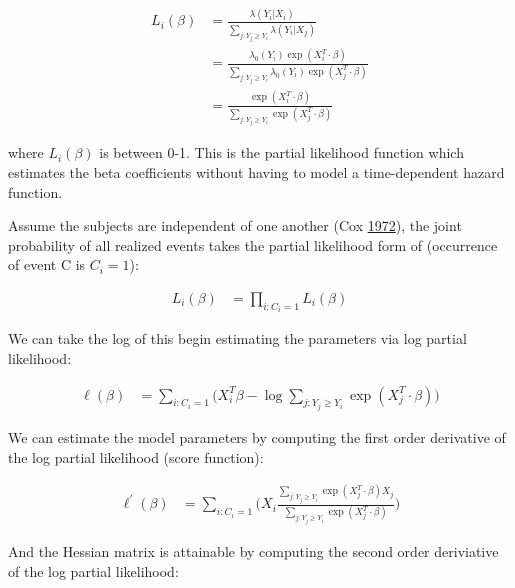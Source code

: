 \documentclass[]{DissertateOSU}
\begin{document}
\begin{equation}
\begin{split}
L_i(\beta) & = \frac{\lambda(Y_i|X_i)}{\sum_{j:Y_j \geq Y_i} \lambda(Y_i|X_j)} \\
& = \frac{\lambda_0(Y_i)\exp(X_{i}^{T} \cdot \beta)}{\sum_{j:Y_j \geq Y_i}\lambda_0(Y_i) \exp(X_{j}^{T} \cdot \beta)} \\
& = \frac{\exp(X_{i}^{T} \cdot \beta)}{\sum_{j:Y_j \geq Y_i}\exp(X_{j}^{T} \cdot \beta)}
\end{split}
\end{equation}

\noindent where \(L_{i}(\beta)\) is between 0-1. This is the partial
likelihood function which estimates the beta coefficients without having
to model a time-dependent hazard function.

Assume the subjects are independent of one another (Cox
\protect\hyperlink{ref-cox1972}{1972}), the joint probability of all
realized events takes the partial likelihood form of (occurrence of
event C is \(C_{i} = 1\)):

\begin{equation}
\begin{split}
L_i(\beta) & = \prod_{i:C_{i}=1} L_{i}(\beta)
\end{split}
\end{equation}

We can take the log of this begin estimating the parameters via log
partial likelihood:

\begin{equation}
\begin{split}
\ell(\beta) & = \sum_{i:C_{i}=1}\big(X_{i}^{T}\beta - \log\sum_{j:Y_{j}\geq Y_i}\exp(X_{j}^{T} \cdot \beta) \big)
\end{split}
\end{equation}

We can estimate the model parameters by computing the first order
derivative of the log partial likelihood (score function):

\begin{equation}
\begin{split}
\ell^{\prime}(\beta) & = \sum_{i:C_{i}=1}\Big(X_{i} \frac{\sum_{j:Y_{j}\geq Y_{i}}\exp(X_{j}^{T} \cdot \beta) X_j}{\sum_{j:Y_{j}\geq Y_{i}}\exp(X_{j}^{T} \cdot \beta)} \Big)
\end{split}
\end{equation}

And the Hessian matrix is attainable by computing the second order
deriviative of the log partial likelihood:
\end{document}
